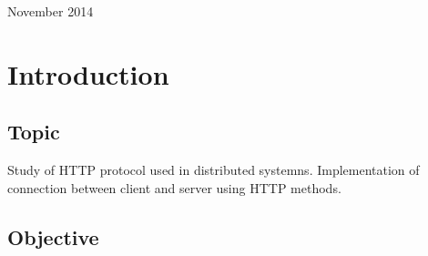 \documentclass[12pt]{article}
\begin{document}
\begin{titlepage}
\begin{center}
      \vspace{5 mm}


      {\large November 2014}\\[3cm] %




      \vfill %
      \end{center}
      \end{titlepage}



  \section{Introduction}

  \subsection{Topic}

  Study of HTTP protocol used in distributed systemns. 
  Implementation of connection between client and server using HTTP methods.

  \subsection{Objective}
\end{document}
